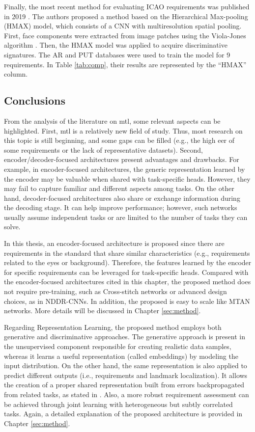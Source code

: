 Finally, the most recent method for evaluating ICAO requirements was published in 2019 \citep{nourbakhshfacial}. The authors proposed a method based on the Hierarchical Max-pooling (HMAX) model, which consists of a CNN with multiresolution spatial pooling. First, face components were extracted from image patches using the Viola-Jones algorithm \citep{viola2001rapid}. Then, the HMAX model was applied to acquire discriminative signatures. The AR \citep{martinez1998ar} and PUT \citep{kasinski2008put} databases were used to train the model for 9 requirements. In Table \ref{tab:comp}, their results are represented by the ``HMAX'' column.
 
\subsection{Conclusions}
 
From the analysis of the literature on \acl{mtl}, some relevant aspects can be highlighted. First, \acs{mtl} is a relatively new field of study. Thus, most research on this topic is still beginning, and some gaps can be filled (e.g., the high \acs{eer} of some requirements or the lack of representative datasets). Second, encoder/decoder-focused architectures present advantages and drawbacks. For example, in encoder-focused architectures, the generic representation learned by the encoder may be valuable when shared with task-specific heads. However, they may fail to capture familiar and different aspects among tasks. On the other hand, decoder-focused architectures also share or exchange information during the decoding stage. It can help improve performance; however, such networks usually assume independent tasks or are limited to the number of tasks they can solve. 
 
In this thesis, an encoder-focused architecture is proposed since there are requirements in the \icao standard that share similar characteristics (e.g., requirements related to the eyes or background). Therefore, the features learned by the encoder for specific requirements can be leveraged for task-specific heads. Compared with the encoder-focused architectures cited in this chapter, the proposed method does not require pre-training, such as Cross-stitch networks or advanced design choices, as in NDDR-CNNs. In addition, the proposed \methodname is easy to scale like MTAN networks. More details will be discussed in Chapter \ref{sec:method}.
 
Regarding Representation Learning, the proposed method employs both generative and discriminative approaches. The generative approach is present in the unsupervised component responsible for creating realistic data samples, whereas it learns a useful representation (called embeddings) by modeling the input distribution. On the other hand, the same representation is also applied to predict different outputs (i.e., requirements and landmark localization). It allows the creation of a proper shared representation built from errors backpropagated from related tasks, as stated in \citep{zhang2014facial}. Also, a more robust requirement assessment can be achieved through joint learning with heterogeneous but subtly correlated tasks. Again, a detailed explanation of the proposed architecture is provided in Chapter \ref{sec:method}.
 
